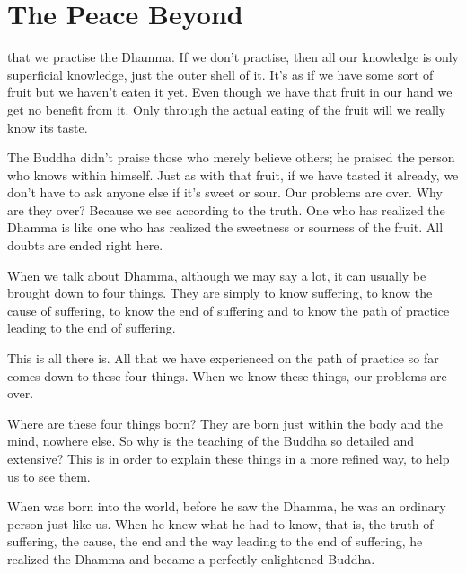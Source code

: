 
\chapter{The Peace Beyond}

 that we practise the Dhamma. If we don't practise, then all our knowledge is only superficial knowledge, just the outer shell of it. It's as if we have some sort of fruit but we haven't eaten it yet. Even though we have that fruit in our hand we get no benefit from it. Only through the actual eating of the fruit will we really know its taste.

The Buddha didn't praise those who merely believe others; he praised the person who knows within himself. Just as with that fruit, if we have tasted it already, we don't have to ask anyone else if it's sweet or sour. Our problems are over. Why are they over? Because we see according to the truth. One who has realized the Dhamma is like one who has realized the sweetness or sourness of the fruit. All doubts are ended right here. 

When we talk about Dhamma, although we may say a lot, it can usually be brought down to four things. They are simply to know suffering, to know the cause of suffering, to know the end of suffering and to know the path of practice leading to the end of suffering. 

This is all there is. All that we have experienced on the path of practice so far comes down to these four things. When we know these things, our problems are over. 

Where are these four things born? They are born just within the body and the mind, nowhere else. So why is the teaching of the Buddha so detailed and extensive? This is in order to explain these things in a more refined way, to help us to see them. 

When  was born into the world, before he saw the Dhamma, he was an ordinary person just like us. When he knew what he had to know, that is, the truth of suffering, the cause, the end and the way leading to the end of suffering, he realized the Dhamma and became a perfectly enlightened Buddha. 

